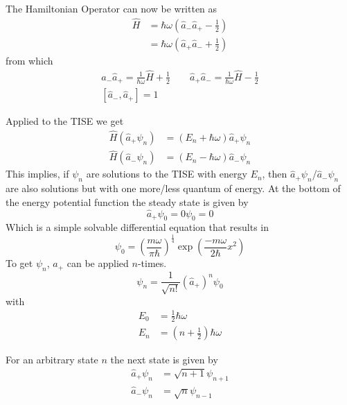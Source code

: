 
The Hamiltonian Operator can now be written as
\noindent\begin{align*}
    \hat{H} & =\hbar\omega\left(\hat{a}_{-}\hat{a}_{+}-\frac{1}{2}\right) \\
            & =\hbar\omega\left(\hat{a}_{+}\hat{a}_{-}+\frac{1}{2}\right)
\end{align*}
from which
\noindent\begin{gather*}
    \hat{a}_{-}\hat{a}_{+}=\frac{1}{\hbar\omega}\hat{H}+\frac{1}{2} \quad\quad \hat{a}_{+}\hat{a}_{-}=\frac{1}{\hbar\omega}\hat{H}-\frac{1}{2}\\
    \left[\hat{a}_{-},\hat{a}_{+}\right] = 1
\end{gather*}


Applied to the TISE we get
\begin{align*}
    \widehat{H}(\hat{a}_{+}\psi_n) & = (E_n+\hbar\omega)\hat{a}_{+}\psi_n \\
    \widehat{H}(\hat{a}_{-}\psi_n) & = (E_n-\hbar\omega)\hat{a}_{-}\psi_n
\end{align*}
This implies, if $\psi_n$ are solutions to the TISE with energy $E_n$, then $\hat{a}_{+}\psi_n$/$\hat{a}_{-}\psi_n$ are also solutions but with one more/less quantum of energy.
\newpar{}
At the bottom of the energy potential function the steady state is given by
\begin{equation*}
    \hat{a}_{+}\psi_0 = 0\psi_0 = 0
\end{equation*}
Which is a simple solvable differential equation that results in
\begin{equation*}
    \psi_0 = {\left(\frac{m\omega}{\pi\hbar}\right)}^{\frac{1}{4}}\exp\left(\frac{-m\omega}{2\hbar}x^2\right)
\end{equation*}
To get $\psi_n$, $\hat{a}_{+}$ can be applied $n$-times.
\begin{equation*}
    \psi_n = \frac{1}{\sqrt{n!}}{\left(\hat{a}_{+}\right)}^n \psi_0
\end{equation*}
with
\begin{align*}
    E_0 & = \frac{1}{2}\hbar\omega     \\
    E_n & = (n+\frac{1}{2})\hbar\omega
\end{align*}

For an arbitrary state $n$ the next state is given by
\begin{align*}
    \hat{a}_{+}\psi_n & = \sqrt{n+1}\psi_{n+1} \\
    \hat{a}_{-}\psi_n & = \sqrt{n}\psi_{n-1}
\end{align*}

